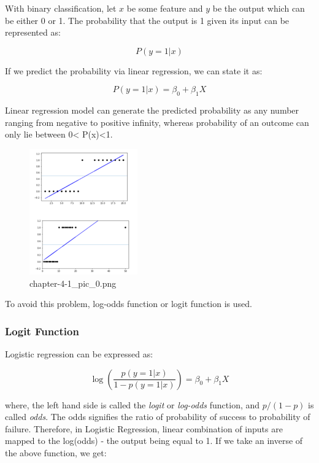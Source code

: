 \documentclass[11pt]{article}
\begin{document}
With binary classification, let \(x\) be some feature and \(y\) be the
output which can be either 0 or 1. The probability that the output is 1
given its input can be represented as:

\[P(y=1 \vert x) \]

If we predict the probability via linear regression, we can state it as:

\[P(y=1 \vert x) = \beta_0 + \beta_1 X\]

Linear regression model can generate the predicted probability as any
number ranging from negative to positive infinity, whereas probability
of an outcome can only lie between 0\textless{} P(x)\textless1.

    \begin{figure}
\centering
\includegraphics{./pic/chapter-4-1_pic_0.png}
\caption{chapter-4-1\_pic\_0.png}
\end{figure}

    To avoid this problem, log-odds function or logit function is used.

\hypertarget{logit-function}{%
\subsubsection{Logit Function}\label{logit-function}}

Logistic regression can be expressed as:

\begin{equation}
\log \left( \frac{p(y=1\vert x)}{1-p(y=1\vert x)}\right) = \beta_0 + \beta_1 X
\end{equation}

where, the left hand side is called the \emph{logit} or \emph{log-odds}
function, and \(p/(1-p)\) is called \emph{odds}. The odds signifies the
ratio of probability of success to probability of failure. Therefore, in
Logistic Regression, linear combination of inputs are mapped to the
log(odds) - the output being equal to 1. If we take an inverse of the
above function, we get:
\end{document}
